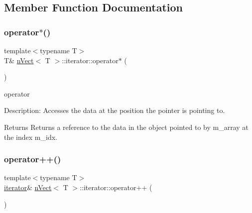 \subsection{Member Function Documentation}
\mbox{\label{classnVect_1_1iterator_a03ab1ec9dbcf379a4c0723536d763306}} 
\subsubsection{\texorpdfstring{operator$\ast$()}{operator*()}}
{\footnotesize\ttfamily template$<$typename T$>$ \\
T\& \hyperlink{classnVect}{n\+Vect}$<$ T $>$\+::iterator\+::operator$\ast$ (\begin{DoxyParamCaption}{ }\end{DoxyParamCaption})\hspace{0.3cm}{\ttfamily [inline]}}




\begin{DoxyItemize}
\item operator 
\end{DoxyItemize}

Description\+: Accesses the data at the position the pointer is pointing to. \begin{DoxyReturn}{Returns}
Returns a reference to the data in the object pointed to by m\+\_\+array at the index m\+\_\+idx. 
\end{DoxyReturn}
\mbox{\label{classnVect_1_1iterator_a92ca21ca2cc2d12095cafccf7c0d1e8f}} 
\subsubsection{\texorpdfstring{operator++()}{operator++()}\hspace{0.1cm}{\footnotesize\ttfamily [1/2]}}
{\footnotesize\ttfamily template$<$typename T$>$ \\
\hyperlink{classnVect_1_1iterator}{iterator}\& \hyperlink{classnVect}{n\+Vect}$<$ T $>$\+::iterator\+::operator++ (\begin{DoxyParamCaption}{ }\end{DoxyParamCaption})\hspace{0.3cm}{\ttfamily [inline]}}



